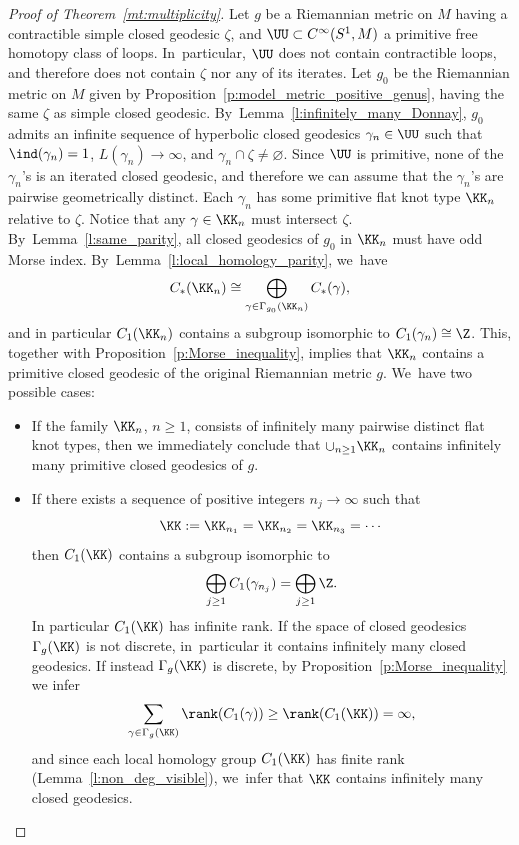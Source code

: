 \begin{proof}[Proof of Theorem~\ref{mt:multiplicity}]
Let $g$ be a Riemannian metric on $M$ having a contractible simple closed geodesic $\zeta$, and $\UU\subset C^\infty(S^1,M)$ a primitive free homotopy class of loops. In~particular, $\UU$ does not contain contractible loops, and therefore does not contain $\zeta$ nor any of its iterates.
Let $g_0$ be the Riemannian metric on $M$ given by Proposition~\ref{p:model_metric_positive_genus}, having the same $\zeta$ as simple closed geodesic. By~Lemma~\ref{l:infinitely_many_Donnay}, $g_0$ admits an infinite sequence of hyperbolic closed geodesics $\gamma_n\in\UU$ such that $\ind(\gamma_n)=1$, $L(\gamma_n)\to\infty$, and $\gamma_n\cap\zeta\neq\varnothing$. Since $\UU$ is primitive, none of the $\gamma_n$'s is an iterated closed geodesic, and therefore we can assume that the $\gamma_n$'s are pairwise geometrically distinct. Each $\gamma_n$ has some primitive flat knot type $\KK_n$ relative to $\zeta$. Notice that any $\gamma\in\KK_n$ must intersect $\zeta$. By~Lemma~\ref{l:same_parity}, all closed geodesics of $g_0$ in $\KK_n$ must have odd Morse index. By~Lemma~\ref{l:local_homology_parity}, we~have
\[
C_*(\KK_n) \cong \bigoplus_{\gamma\in\Gamma_{g_0}(\KK_n)} C_*(\gamma),
\]
and in particular $C_1(\KK_n)$ contains a subgroup isomorphic to $C_1(\gamma_n)\cong\Z$. This, together with Proposition~\ref{p:Morse_inequality}, implies that $\KK_n$ contains a primitive closed geodesic of the original Riemannian metric $g$. We~have two possible cases:
\begin{itemize}
\item If the family $\KK_n$, $n\geq1$, consists of infinitely many pairwise distinct flat knot types, then we immediately conclude that $\cup_{n\geq1}\KK_n$ contains infinitely many primitive closed geodesics of $g$.

\item If there exists a sequence of positive integers $n_j\to\infty$ such that
\[
\KK:=\KK_{n_1}=\KK_{n_2}=\KK_{n_3}=\cdots
\]
then $C_1(\KK)$ contains a subgroup isomorphic to
\[
\bigoplus_{j\geq1}C_1(\gamma_{n_j})=\bigoplus_{j\geq1}\Z.
\]
In particular $C_1(\KK)$ has infinite rank.
If the space of closed geodesics $\Gamma_g(\KK)$ is not discrete, in~particular it contains infinitely many closed geodesics. If instead $\Gamma_g(\KK)$ is discrete, by Proposition~\ref{p:Morse_inequality} we infer
\begin{align*}
\sum_{\gamma\in\Gamma_g(\KK)}
\rank(C_1(\gamma))
\geq
\rank(C_1(\KK))
=\infty,
\end{align*}
and since each local homology group $C_1(\KK)$ has finite rank (Lemma~\ref{l:non_deg_visible}), we~infer that $\KK$ contains infinitely many closed geodesics.
\qedhere
\end{itemize}
\end{proof}

